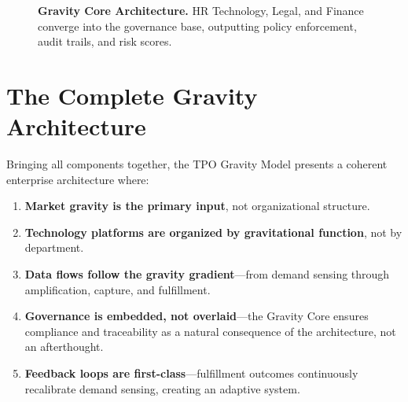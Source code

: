 \documentclass[11pt,a4paper,twocolumn]{article}
\begin{document}
\begin{figure}[t]
{%
}
\caption{\textbf{Gravity Core Architecture.} HR Technology, Legal, and Finance converge into the governance base, outputting policy enforcement, audit trails, and risk scores.}
\label{fig:gravity-core}
\end{figure}


\section{The Complete Gravity Architecture}
\label{sec:complete}

Bringing all components together, the TPO Gravity Model presents a coherent enterprise architecture where:

\begin{enumerate}[leftmargin=1.5em]
  \item \textbf{Market gravity is the primary input}, not organizational structure.
  \item \textbf{Technology platforms are organized by gravitational function}, not by department.
  \item \textbf{Data flows follow the gravity gradient}---from demand sensing through amplification, capture, and fulfillment.
  \item \textbf{Governance is embedded, not overlaid}---the Gravity Core ensures compliance and traceability as a natural consequence of the architecture, not an afterthought.
  \item \textbf{Feedback loops are first-class}---fulfillment outcomes continuously recalibrate demand sensing, creating an adaptive system.
\end{enumerate}
\end{document}
